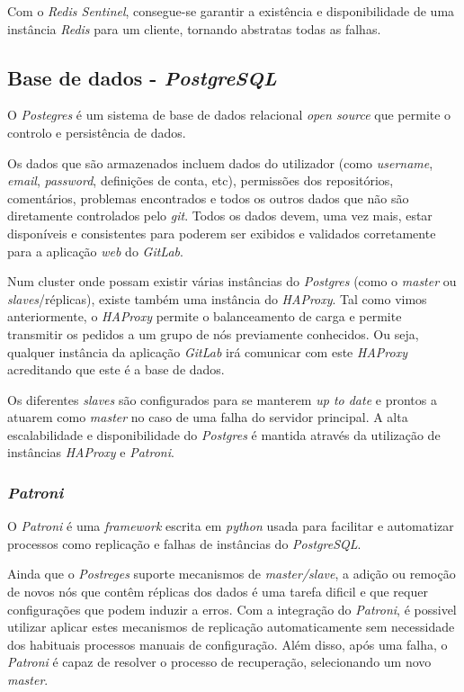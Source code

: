 \documentclass[12pt,a4paper]{article}
\begin{document}
Com o \emph{Redis Sentinel}, consegue-se garantir a existência e disponibilidade de uma instância \emph{Redis} para um cliente, tornando abstratas todas as falhas.




\subsection{Base de dados - \emph{PostgreSQL}}
O \emph{Postegres} é um sistema de base de dados relacional \emph{open source} que permite o controlo e  persistência de dados.

Os dados que são armazenados incluem dados do utilizador (como \emph{username}, \emph{email}, \emph{password}, definições de conta, etc), permissões dos repositórios, comentários, problemas encontrados e todos os outros dados que não são diretamente controlados pelo \emph{git}. Todos os dados devem, uma vez mais, estar disponíveis e consistentes para poderem ser exibidos e validados corretamente para a aplicação \emph{web} do \emph{GitLab}.

Num cluster onde possam existir várias instâncias do \emph{Postgres} (como o \emph{master} ou \emph{slaves}/réplicas), existe também uma instância do \emph{HAProxy}. Tal como vimos anteriormente, o \emph{HAProxy} permite o balanceamento de carga e permite transmitir os pedidos a um grupo de nós previamente conhecidos. Ou seja, qualquer instância da aplicação \emph{GitLab} irá comunicar com este \emph{HAProxy} acreditando que este é a base de dados. 

Os diferentes \emph{slaves} são configurados para se manterem \emph{up to date} e prontos a atuarem como \emph{master} no caso de uma falha do servidor principal. A alta escalabilidade e disponibilidade do \emph{Postgres} é mantida através da utilização de instâncias \emph{HAProxy} e \emph{Patroni}.


\subsubsection{\emph{Patroni}}

O \emph{Patroni} é uma \emph{framework} escrita em \emph{python} usada para facilitar e automatizar processos como replicação e falhas de instâncias do  \emph{PostgreSQL}.

Ainda que o \emph{Postreges} suporte mecanismos de \emph{master/slave}, a adição ou remoção de novos nós que contêm réplicas dos dados é uma tarefa dificil e que requer configurações que podem induzir a erros. Com a integração do \emph{Patroni}, é possivel utilizar aplicar estes mecanismos de replicação automaticamente sem necessidade dos habituais processos manuais de configuração. Além disso, após uma falha, o \emph{Patroni} é capaz de resolver o processo de recuperação, selecionando um novo \emph{master}.
\end{document}
